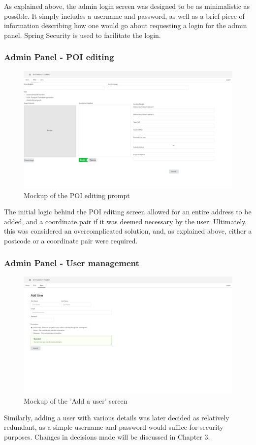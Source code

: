 As explained above, the admin login screen was designed to be as minimalistic as possible. It simply includes a username and password, as well as a brief piece of information describing how one would go about requesting a login for the admin panel. Spring Security is used to facilitate the login.

\subsubsection{Admin Panel - POI editing}
\begin{figure}[!htbp]
\includegraphics[scale=0.2]{mockups/Admin Panel - POIs (not filled, English)}
\caption{Mockup of the POI editing prompt}
\end{figure}

The initial logic behind the POI editing screen allowed for an entire address to be added, and a coordinate pair if it was deemed necessary by the user. Ultimately, this was considered an overcomplicated solution, and, as explained above, either a postcode or a coordinate pair were required.
\newpage
\subsubsection{Admin Panel - User management}
\begin{figure}[!htbp]
\includegraphics[scale=0.2]{mockups/Admin Panel - Add User}
\caption{Mockup of the 'Add a user' screen}
\end{figure}

Similarly, adding a user with various details was later decided as relatively redundant, as a simple username and password would suffice for security purposes. Changes in decisions made will be discussed in Chapter 3.

